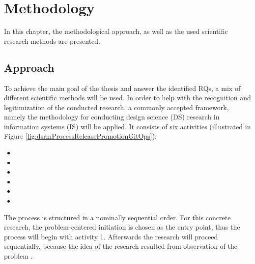 \chapter{Methodology}

In this chapter,
the methodological approach,
as well as
the used scientific research methods
are presented.


\section{Approach}


To achieve the main goal of the thesis and answer the identified RQs,
a mix of different scientific methods will be used.
In order to help with the recognition and legitimization of the conducted research,
a commonly accepted framework, namely
the methodology for conducting design science (DS) research
in information systems (IS)
\autocite{designScienceResearchMethodologyForInformationSystemsResearch}
will be applied.
It consists of six activities
(illustrated in Figure \ref{fig:dsrmProcessReleasePromotionGitOps}):

\begin{itemize}
	\item {}
	\item {}
	\item {}
	\item {}
	\item {}
	\item {}
\end{itemize}

The process is structured in a nominally sequential order.
For this concrete research,
the problem-centered initiation is chosen as the entry point,
thus the process will begin with activity 1.
Afterwards the research will proceed sequentially,
because the idea of the research resulted from observation of the problem
\autocite{designScienceResearchMethodologyForInformationSystemsResearch}.
\bigskip

